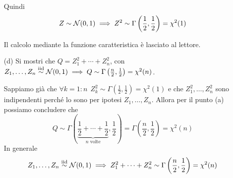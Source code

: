 \begin{enumerate}
Quindi
\[
Z\sim\mathcal{N}(0,1)\implies Z^2\sim\Gamma\left(\frac{1}{2},\frac{1}{2}\right)=\chi^2(1)
\]
\begin{oss}
Il calcolo mediante la funzione caratteristica è lasciato al lettore.
\end{oss}

\item [(d)] Si mostri che $Q=Z_1^2+\cdots+Z_n^2$, con $Z_1,\dots,Z_n\stackrel{\mathrm{iid}}{\sim}\mathcal{N}(0,1)\implies Q\sim\Gamma\left(\frac{n}{2},\frac{1}{2}\right)=\chi^2(n)$.

Sappiamo già che $\forall k=1:n\ \ Z_k^2\sim\Gamma\left(\frac{1}{2},\frac{1}{2}\right)=\chi^2(1)$ e che $Z_1^2,\dots,Z_n^2$ sono indipendenti perché lo sono per ipotesi $Z_1,\dots,Z_n$. Allora per il punto (a) possiamo concludere che
\[
Q\sim\Gamma\left(\underbrace{\frac{1}{2}+\cdots+\frac{1}{2}}_{n\text{ volte}}, \frac{1}{2}  \right)=\Gamma\left( \frac{n}{2},\frac{1}{2} \right)=\chi^2(n)
\]
In generale
\[
Z_1,\dots,Z_n\stackrel{\mathrm{iid}}{\sim}\mathcal{N}(0,1)\implies Z_1^2+\cdots+Z_n^2\sim\Gamma\left(\frac{n}{2},\frac{1}{2}\right)=\chi^2(n)
\]
\end{enumerate}

